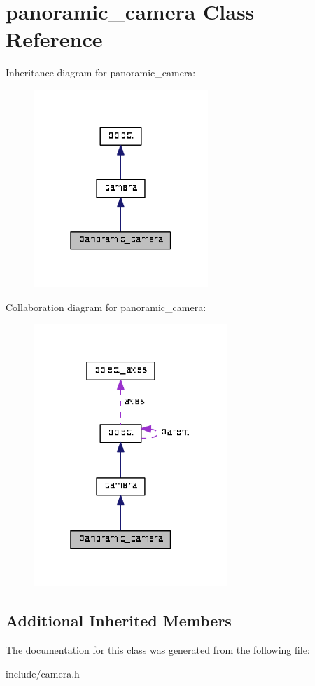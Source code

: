 \hypertarget{classpanoramic__camera}{}\section{panoramic\+\_\+camera Class Reference}
\label{classpanoramic__camera}


Inheritance diagram for panoramic\+\_\+camera\+:\nopagebreak
\begin{figure}[H]
\begin{center}
\leavevmode
\includegraphics[width=187pt]{classpanoramic__camera__inherit__graph}
\end{center}
\end{figure}


Collaboration diagram for panoramic\+\_\+camera\+:\nopagebreak
\begin{figure}[H]
\begin{center}
\leavevmode
\includegraphics[width=208pt]{classpanoramic__camera__coll__graph}
\end{center}
\end{figure}
\subsection*{Additional Inherited Members}


The documentation for this class was generated from the following file\+:\begin{DoxyCompactItemize}
\item 
include/camera.\+h\end{DoxyCompactItemize}

